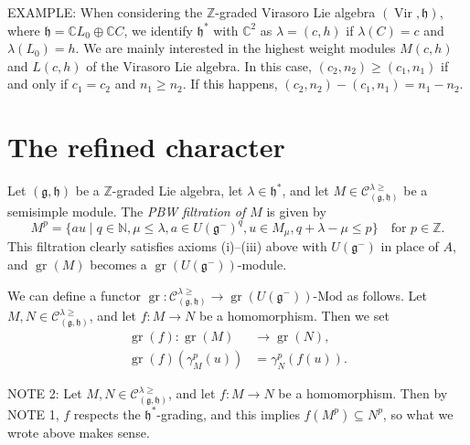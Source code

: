 \documentclass[a4paper, 12pt, reqno]{amsart}
\DeclareMathOperator{\Vir}{Vir}
\DeclareMathOperator{\gr}{gr}
\begin{document}
EXAMPLE: When considering the $\mathbb{Z}$-graded Virasoro Lie algebra $(\Vir, \mathfrak{h})$, where $\mathfrak{h} = \mathbb{C}L_0 \oplus \mathbb{C}C$, we identify $\mathfrak{h}^*$ with $\mathbb{C}^2$ as $\lambda = (c, h)$ if $\lambda(C) = c$ and $\lambda(L_0) = h$.
We are mainly interested in the highest weight modules $M(c, h)$ and $L(c, h)$ of the Virasoro Lie algebra.
In this case, $(c_2, n_2) \ge (c_1, n_1)$ if and only if $c_1 = c_2$ and $n_1 \ge n_2$.
If this happens, $(c_2, n_2) - (c_1, n_1) = n_1 - n_2$.

\section{The refined character}
\label{sec:refined-character}

Let $(\mathfrak{g}, \mathfrak{h})$ be a $\mathbb{Z}$-graded Lie algebra, let $\lambda \in \mathfrak{h}^*$, and let $M \in \mathcal{C}^{\lambda \ge}_{(\mathfrak{g}, \mathfrak{h})}$ be a semisimple module.
The \emph{PBW filtration of $M$} is given by
\begin{equation*}
  M^p = \{au \mid q \in \mathbb{N}, \mu \le \lambda, a \in U(\mathfrak{g}^-)^q, u \in M_{\mu}, q + \lambda - \mu \le p\} \quad \text{for $p \in \mathbb{Z}$}.
\end{equation*}
This filtration clearly satisfies axioms (i)--(iii) above with $U(\mathfrak{g}^-)$ in place of $A$, and $\gr(M)$ becomes a $\gr(U(\mathfrak{g^-}))$-module.

We can define a functor $\gr: \mathcal{C}^{\lambda \ge}_{(\mathfrak{g}, \mathfrak{h})} \to \gr(U(\mathfrak{g}^-))\text{-Mod}$ as follows.
Let $M, N \in \mathcal{C}^{\lambda \ge}_{(\mathfrak{g}, \mathfrak{h})}$, and let $f: M \to N$ be a homomorphism.
Then we set
\begin{align*}
  \gr(f): \gr(M) &\to \gr(N), \\
  \gr(f)(\gamma_M^p(u)) &= \gamma_N^p(f(u)).
\end{align*}

NOTE 2: Let $M, N \in \mathcal{C}^{\lambda \ge}_{(\mathfrak{g}, \mathfrak{h})}$, and let $f: M \to N$ be a homomorphism.
Then by NOTE 1, $f$ respects the $\mathfrak{h}^*$-grading, and this implies $f(M^p) \subseteq N^p$, so what we wrote above makes sense.
\end{document}
